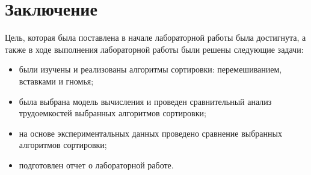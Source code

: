 \chapter*{Заключение}

Цель, которая была поставлена в начале лабораторной работы была достигнута, а также в ходе выполнения лабораторной работы были решены следующие задачи:

\begin{itemize}
	\item были изучены и реализованы алгоритмы сортировки: перемешиванием, вставками и гномья;
	\item была выбрана модель вычисления и проведен сравнительный анализ трудоемкостей выбранных алгоритмов сортировки;
    \item на основе экспериментальных данных проведено сравнение выбранных алгоритмов сортировки;
	\item подготовлен отчет о лабораторной работе.
\end{itemize}